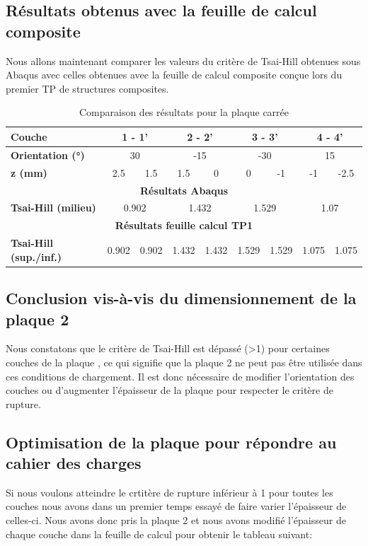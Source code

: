 \documentclass[a4paper,12pt]{article}
\begin{document}
\subsection{Résultats obtenus avec la feuille de calcul composite}
Nous allons maintenant comparer les valeurs du critère de Tsai-Hill obtenues sous Abaqus avec celles obtenues avec la feuille de calcul composite conçue lors du premier TP de structures composites.

\begin{table}[h]
	\centering
	\begin{tabular}{|l|c|c|c|c|c|c|c|c|}
	\hline
	\textbf{Couche} & \multicolumn{2}{c|}{1 - 1'} & \multicolumn{2}{c|}{2 - 2'} & \multicolumn{2}{c|}{3 - 3'} & \multicolumn{2}{c|}{4 - 4'} \\ \hline
	\textbf{Orientation (°)} & \multicolumn{2}{c|}{30} & \multicolumn{2}{c|}{-15} & \multicolumn{2}{c|}{-30} & \multicolumn{2}{c|}{15} \\ \hline
	\textbf{z (mm)} & 2.5 & 1.5 & 1.5 & 0 & 0 & -1 & -1 & -2.5 \\ \hline
	\multicolumn{9}{|c|}{\textbf{Résultats Abaqus}} \\ \hline
	\textbf{Tsai-Hill (milieu)} & \multicolumn{2}{c|}{0.902} & \multicolumn{2}{c|}{1.432} & \multicolumn{2}{c|}{1.529} & \multicolumn{2}{c|}{1.07} \\ \hline
	\multicolumn{9}{|c|}{\textbf{Résultats feuille calcul TP1}} \\ \hline
	\textbf{Tsai-Hill (sup./inf.)} & 0.902 & 0.902 & 1.432 & 1.432 & 1.529 & 1.529 &  1.075 &  1.075 \\ \hline
	\end{tabular}
	\caption{Comparaison des résultats pour la plaque carrée }
	\label{fig:Comparaison plaque carrée}
\end{table}

\subsection{Conclusion vis-à-vis du dimensionnement de la plaque 2}
Nous constatons que le critère de Tsai-Hill est dépassé (>1) pour certaines couches de la plaque , ce qui signifie que la plaque 2 ne peut pas être utilisée dans ces conditions de chargement. Il est donc nécessaire de modifier l'orientation des couches ou d'augmenter l'épaisseur de la plaque pour respecter le critère de rupture.

\subsection {Optimisation de la plaque pour répondre au cahier des charges}
Si nous voulons atteindre le crtitère de rupture inférieur à 1 pour toutes les couches nous avons dans un premier temps essayé de faire varier l'épaisseur de celles-ci. Nous avons donc pris la plaque 2 et nous avons modifié l'épaisseur de chaque couche dans la feuille de calcul pour obtenir le tableau suivant:
\end{document}
